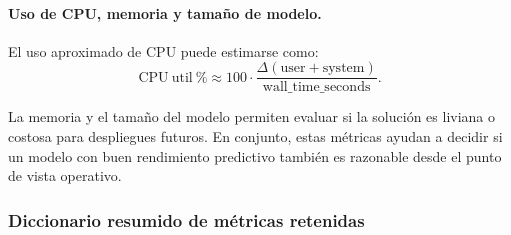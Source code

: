 \documentclass[12pt,oneside]{report}
\begin{document}
\paragraph{Uso de CPU, memoria y tamaño de modelo.}
El uso aproximado de CPU puede estimarse como:
\[
\mathrm{CPU\ util\ \%}\approx 100\cdot \frac{\Delta(\mathrm{user}+\mathrm{system})}{\mathrm{wall\_time\_seconds}}.
\]

La memoria y el tamaño del modelo permiten evaluar si la solución es liviana o costosa para despliegues futuros. En conjunto, estas métricas ayudan a decidir si un modelo con buen rendimiento predictivo también es razonable desde el punto de vista operativo.

\subsubsection{Diccionario resumido de métricas retenidas}
\end{document}

